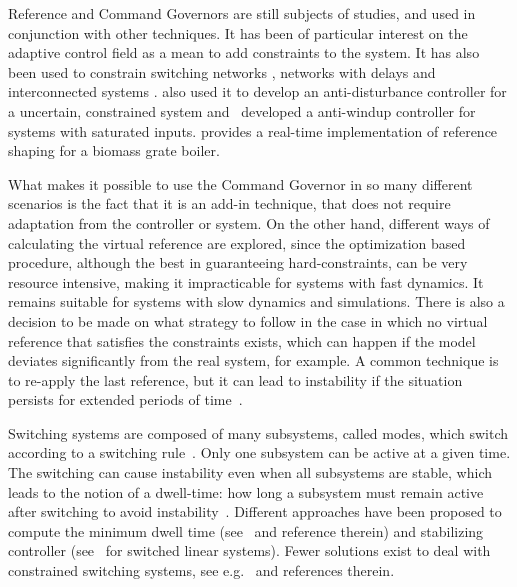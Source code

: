 Reference and Command Governors are still subjects of studies, and used in
conjunction with other techniques. It has been of particular interest on the
adaptive control field
\parencite{arabi.yucelen.ea:command,ristevski.dogan.ea:transient,wilcher.jaramillo.ea:on,dogan.yucelen.ea:improving,gruenwald.yucelen.ea:expanded,makavita.jayasinghe.ea:experimental}
as a mean to add constraints to the system. It has also been used to constrain
switching networks \parencite{ong.djamari.ea:governor}, networks with delays
\parencite{shen.song.ea:constrained} and interconnected systems
\parencite{tedesco.casavola:turn-based}. \textcite{peng.wang.ea:constrained}
also used it to develop an anti-disturbance controller for a uncertain,
constrained system and~\textcite{schwerdtner.bortoff.ea:projection-based}
developed a anti-windup controller for systems with saturated inputs.
\textcite{seeber.golles.ea:reference} provides a real-time implementation of
reference shaping for a biomass grate boiler.

What makes it possible to use the Command Governor in so many different
scenarios is the fact that it is an add-in technique, that does not require
adaptation from the controller or system. On the other hand, different ways of
calculating the virtual reference are explored, since the optimization based
procedure, although the best in guaranteeing hard-constraints, can be very
resource intensive, making it impracticable for systems with fast dynamics. It
remains suitable for systems with slow dynamics and simulations. There is also a
decision to be made on what strategy to follow in the case in which no virtual
reference that satisfies the constraints exists, which can happen if the model
deviates significantly from the real system, for example. A common technique is
to re-apply the last reference, but it can lead to instability if the situation
persists for extended periods of time~\parencite{garone.di-cairano.ea:reference}.

Switching systems are composed of many subsystems, called modes, which switch
according to a switching
rule~\parencite{liberzon:switching,liberzon.morse:basic}. Only one subsystem can
be active at a given time. The switching can cause instability even when all
subsystems are stable, which leads to the notion of a dwell-time: how long a
subsystem must remain active after switching to avoid
instability~\parencite{liberzon.morse:basic}. Different approaches have been
proposed to compute the minimum dwell time
(see~\parencite{chesi.colaneri.ea:computing} and reference therein) and
stabilizing controller (see~\parencite{lin.antsaklis:stability} for switched
linear systems). Fewer solutions exist to deal with constrained switching
systems, see e.g.~\parencite{franzè.lucia.ea:command,lucia.franzè:stabilization}
and references therein.

